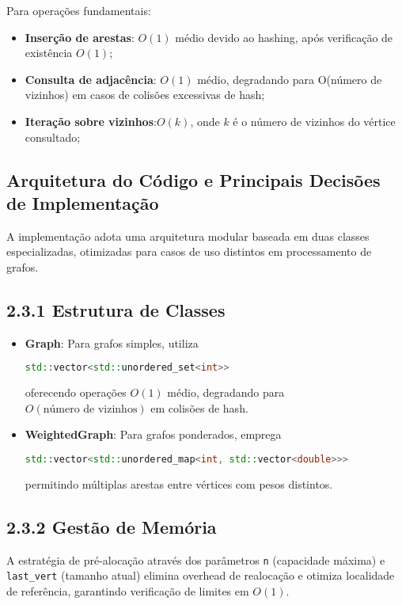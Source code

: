 \documentclass{sbc2023}%
\begin{document}
Para operações fundamentais:
\begin{itemize}
\item \textbf{Inserção de arestas}: \(O(1)\) médio devido ao hashing, após verificação de existência \(O(1)\);
\item \textbf{Consulta de adjacência}: \(O(1)\) médio, degradando para O(número de vizinhos) em casos de colisões excessivas de hash;
\item \textbf{Iteração sobre vizinhos}:\(O(k)\), onde \(k\) é o número de vizinhos do vértice consultado;
\end{itemize}

\subsection{Arquitetura do Código e Principais Decisões de Implementação}

A implementação adota uma arquitetura modular baseada em duas classes especializadas, otimizadas para casos de uso distintos em processamento de grafos.

\subsection{2.3.1 Estrutura de Classes}

\begin{itemize}
    \item \textbf{Graph}: Para grafos simples, utiliza
    \begin{lstlisting}[language=C++]
std::vector<std::unordered_set<int>>
    \end{lstlisting}
    oferecendo operações \(O(1)\) médio, degradando para \(O(\text{número de vizinhos})\) em colisões de hash.

    \item \textbf{WeightedGraph}: Para grafos ponderados, emprega
    \begin{lstlisting}[language=C++]
std::vector<std::unordered_map<int, std::vector<double>>>
    \end{lstlisting}
    permitindo múltiplas arestas entre vértices com pesos distintos.
\end{itemize}

\subsection{2.3.2 Gestão de Memória}

A estratégia de pré-alocação através dos parâmetros \texttt{n} (capacidade máxima) e \texttt{last\_vert} (tamanho atual) elimina overhead de realocação e otimiza localidade de referência, garantindo verificação de limites em \(O(1)\).
\end{document}
